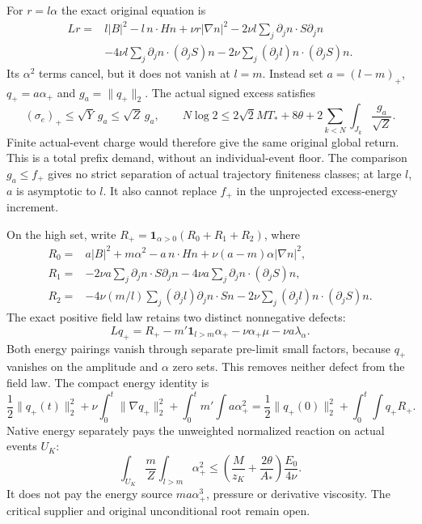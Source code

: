 \documentclass[11pt]{article}
\begin{document}
For $r=l\alpha$ the exact original equation is
\begin{align*}
 Lr={}&l|B|^2-l\,n\cdot Hn+\nu r|\nabla n|^2
        -2\nu l\sum_j\partial_jn\cdot S\partial_jn\\
 &-4\nu l\sum_j\partial_jn\cdot(\partial_jS)n
        -2\nu\sum_j(\partial_jl)n\cdot(\partial_jS)n.
\end{align*}
Its $\alpha^2$ terms cancel, but it does not vanish at $l=m$.
Instead set $a=(l-m)_+$, $q_+=a\alpha_+$ and $g_a=\|q_+\|_2$.
The actual signed excess satisfies
\[
 (\sigma_e)_+\le\sqrt Y\,g_a\le\sqrt Z\,g_a,
 \qquad
 N\log2\le2\sqrt2MT_*+8\theta
                   +2\sum_{k<N}\int_{J_k}\frac{g_a}{\sqrt Z}.
\]
Finite actual-event charge would therefore give the same original global
return. This is a total prefix demand, without an individual-event floor.
The comparison $g_a\le f_+$ gives no strict separation of actual
trajectory finiteness classes; at large $l$, $a$ is asymptotic to $l$.
It also cannot replace $f_+$ in the unprojected excess-energy increment.

On the high set, write $R_+=\mathbf1_{\alpha>0}(R_0+R_1+R_2)$, where
\begin{align*}
 R_0={}&a|B|^2+m\alpha^2-a\,n\cdot Hn
                  +\nu(a-m)\alpha|\nabla n|^2,\\
 R_1={}&-2\nu a\sum_j\partial_jn\cdot S\partial_jn
         -4\nu a\sum_j\partial_jn\cdot(\partial_jS)n,\\
 R_2={}&-4\nu(m/l)\sum_j(\partial_jl)\partial_jn\cdot Sn
         -2\nu\sum_j(\partial_jl)n\cdot(\partial_jS)n.
\end{align*}
The exact positive field law retains two distinct nonnegative defects:
\[
 Lq_+=R_+-m'\mathbf1_{l>m}\alpha_+
             -\nu\alpha_+\mu-\nu a\lambda_\alpha.
\]
Both energy pairings vanish through separate pre-limit small factors,
because $q_+$ vanishes on the amplitude and $\alpha$ zero sets. This
removes neither defect from the field law. The compact energy identity is
\[
 \frac12\|q_+(t)\|_2^2+\nu\int_0^t\|\nabla q_+\|_2^2
 +\int_0^t m'\!\int a\alpha_+^2
 =\frac12\|q_+(0)\|_2^2+\int_0^t\!\int q_+R_+.
\]
Native energy separately pays the unweighted normalized reaction on
actual events $U_K$:
\[
 \int_{U_K}\frac mZ\int_{l>m}\alpha_+^2
 \le\left(\frac M{z_K}+\frac{2\theta}{A_*}\right)\frac{E_0}{4\nu}.
\]
It does not pay the energy source $ma\alpha_+^3$, pressure or derivative
viscosity. The critical supplier and original unconditional root remain open.
\end{document}
